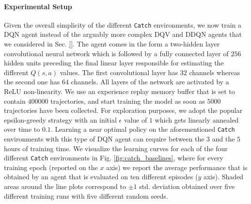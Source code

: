 \paragraph{Experimental Setup}
\label{sec:experimental_setup_control}
Given the overall simplicity of the different \texttt{Catch} environments, we now train a DQN agent instead of the arguably more complex DQV and DDQN agents that we considered in Sec. \ref{}. The agent comes in the form a two-hidden layer convolutional neural network which is followed by a fully connected layer of $256$ hidden units preceding the final linear layer responsible for estimating the different $Q(s,a)$ values. The first convolutional layer has $32$ channels whereas the second one has $64$ channels. All layers of the network are activated by a ReLU non-linearity. We use an experience replay memory buffer that is set to contain $400000$ trajectories, and start training the model as soon as $5000$ trajectories have been collected. For exploration purposes, we adopt the popular epsilon-greedy strategy with an initial $\epsilon$ value of $1$ which gets linearly annealed over time to $0.1$. Learning a near optimal policy on the aforementioned \texttt{Catch} environments with this type of DQN agent can require between the $3$ and the $5$ hours of training time. We visualize the learning curves for each of the four different \texttt{Catch} environments in Fig. \ref{fig:catch_baselines}, where for every training epoch (reported on the $x$ axis) we report the average performance that is obtained by an agent that is evaluated on ten different episodes ($y$ axis). Shaded areas around the line plots correspond to $\pm 1$ std. deviation obtained over five different training runs with five different random seeds.    

